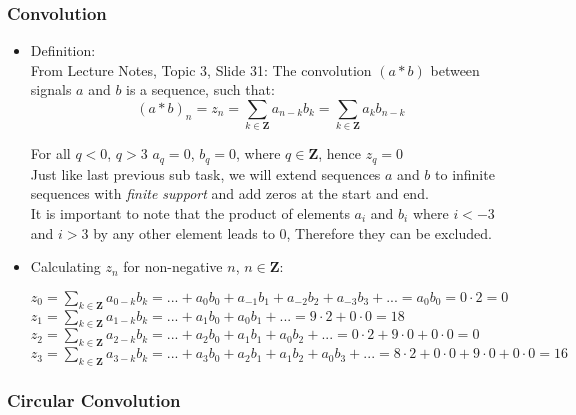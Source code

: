 \documentclass[12pt,a4paper]{article}
\begin{document}
    \subsubsection{Convolution}
        \begin{itemize}
            \item Definition:\\
            From Lecture Notes, Topic 3, Slide 31: The convolution $(a * b)$ between signals $a$ and $b$ is a sequence, such that: $$ (a * b)_n = z_n = \sum_{k \in \boldsymbol{Z}} a_{n-k}b_k = \sum_{k \in \boldsymbol{Z}} a_kb_{n-k} $$
            
            For all $q<0$, $q>3$ $a_q = 0$, $b_q = 0$, where $q \in \boldsymbol{Z}$, hence $z_q = 0$ \\
            
             Just like last previous sub task, we will extend sequences $a$ and $b$ to infinite sequences with \emph{finite support} and add zeros at the start and end. \\
             
             It is important to note that the product of elements $a_i$ and $b_i$ where $i<-3$ and $i>3$ by any other element leads to 0, Therefore they can be excluded.
             
            \item Calculating $z_n$ for non-negative $n$, $n \in \boldsymbol{Z}$:
            
             $z_0 = \sum_{k \in \boldsymbol{Z}} a_{0-k}b_k =... + a_0b_0 + a_{-1}b_1 + a_{-2}b_2 + a_{-3}b_3 + ... = a_0b_0 = 0\cdot 2 = 0$ \\
             $z_1 = \sum_{k \in \boldsymbol{Z}} a_{1-k}b_k =... + a_1b_0 + a_{0}b_1 + ... = 9\cdot 2 + 0\cdot 0 = 18$ \\
             $z_2 = \sum_{k \in \boldsymbol{Z}} a_{2-k}b_k =... + a_2b_0 + a_{1}b_1 + a_{0}b_2 + ... = 0\cdot 2 + 9\cdot 0 + 0\cdot 0 = 0$ \\
             $z_3 = \sum_{k \in \boldsymbol{Z}} a_{3-k}b_k =... + a_3b_0 + a_{2}b_1 + a_{1}b_2 + a_0b_3 + ... = 8\cdot 2 + 0\cdot 0 + 9\cdot 0 + 0\cdot 0 = 16$
        \end{itemize}
        
        
    \subsubsection{Circular Convolution}
    
\end{document}

